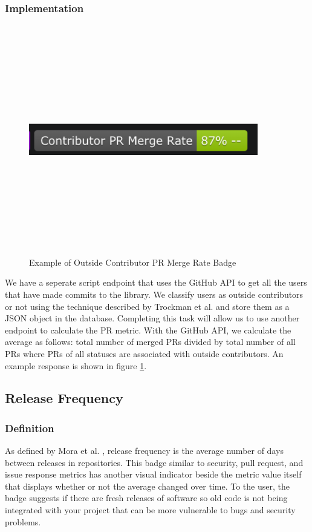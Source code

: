 \documentclass[12pt, letterpaper]{article}
\begin{document}
\subsubsection{Implementation}

\begin{figure}[!htb]
    \centerline{
        \includegraphics[width=10cm,height=10cm,keepaspectratio=true]{prbadge}
    }
    \caption{
        Example of Outside Contributor PR Merge Rate Badge 
    }
    \label{prbadge}
\end{figure}

We have a seperate script endpoint that uses the GitHub \cite{github} API to get all the users
that have made commits to the library. We classify users as outside contributors or not using
the technique described by Trockman et al. \cite{githubbadges} and store them as a JSON object in the database.
Completing this task will allow us to use another endpoint to calculate the PR metric.
With the GitHub \cite{github} API, we calculate
the average as follows: total number of merged PRs divided by total number of all PRs where 
PRs of all statuses are associated with outside contributors. An example response is shown in figure \ref{prbadge}.


\subsection{Release Frequency}
\subsubsection{Definition}
As defined by Mora et al. \cite{metrics}, release frequency is the average number of days between
releases in repositories. This badge similar to security, pull request, and issue response metrics has 
another visual indicator beside the metric value itself that displays whether or not the average changed over time. 
To the user, the badge suggests if there are fresh releases of software so old code is not being integrated with your
project that can be more vulnerable to bugs and security problems.
\end{document}
